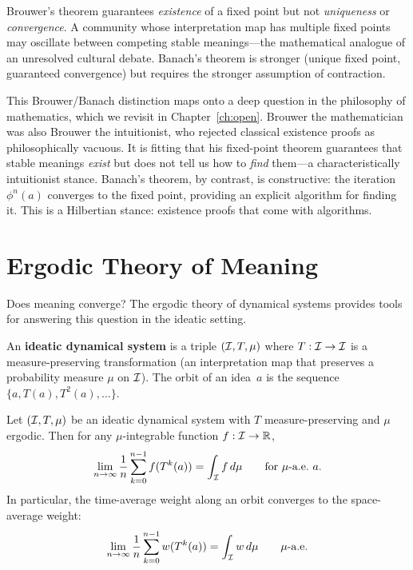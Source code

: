 \begin{remark}
Brouwer's theorem guarantees \emph{existence} of a fixed point but
not \emph{uniqueness} or \emph{convergence}.  A community whose
interpretation map has multiple fixed points may oscillate between
competing stable meanings---the mathematical analogue of an unresolved
cultural debate.  Banach's theorem is stronger (unique fixed point,
guaranteed convergence) but requires the stronger assumption of
contraction.

This Brouwer/Banach distinction maps onto a deep question in the
philosophy of mathematics, which we revisit in Chapter~\ref{ch:open}.
Brouwer the mathematician was also Brouwer the intuitionist, who
rejected classical existence proofs as philosophically vacuous.
It is fitting that his fixed-point theorem guarantees that stable
meanings \emph{exist} but does not tell us how to \emph{find} them---a
characteristically intuitionist stance.  Banach's theorem, by contrast,
is constructive: the iteration $\phi^n(a)$ converges to the fixed point,
providing an explicit algorithm for finding it.  This is a Hilbertian
stance: existence proofs that come with algorithms.
\end{remark}

\section{Ergodic Theory of Meaning}
\label{sec:ergodic}

Does meaning converge?  The ergodic theory of dynamical systems provides
tools for answering this question in the ideatic setting.

\begin{definition}
\label{def:ideatic-dynamics}
An \textbf{ideatic dynamical system} is a triple $(\mathcal{I}, T, \mu)$
where $T : \mathcal{I} \to \mathcal{I}$ is a measure-preserving transformation
(an interpretation map that preserves a probability measure
$\mu$ on $\mathcal{I}$).  The orbit of an idea~$a$ is the sequence
$\{a, T(a), T^2(a), \ldots\}$.
\end{definition}

\begin{theorem}
\label{thm:birkhoff}
Let $(\mathcal{I}, T, \mu)$ be an ideatic dynamical system with $T$
measure-preserving and $\mu$ ergodic.  Then for any
$\mu$-integrable function $f : \mathcal{I} \to \mathbb{R}$,
\[
  \lim_{n \to \infty} \frac{1}{n} \sum_{k=0}^{n-1} f(T^k(a))
  = \int_{\mathcal{I}} f\, d\mu
  \qquad \text{for $\mu$-a.e.\ } a.
\]
In particular, the time-average weight along an orbit converges to
the space-average weight:
\[
  \lim_{n \to \infty} \frac{1}{n} \sum_{k=0}^{n-1} w(T^k(a))
  = \int_{\mathcal{I}} w\, d\mu
  \qquad \text{$\mu$-a.e.}
\]
\end{theorem}


